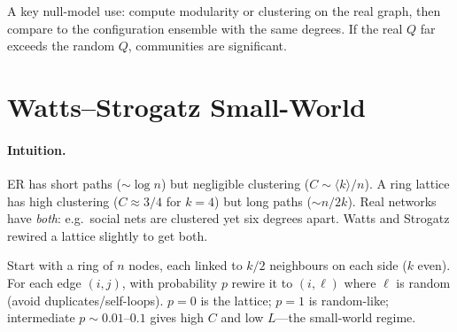 A key null-model use: compute modularity or clustering on the real graph, then compare to the configuration ensemble with the same degrees. If the real $Q$ far exceeds the random $Q$, communities are significant.

\section{Watts--Strogatz Small-World}
\label{sec:ws}
\paragraph{Intuition.} ER has short paths ($\sim\log n$) but negligible clustering ($C\sim\langle k\rangle/n$). A ring lattice has high clustering ($C\approx3/4$ for $k=4$) but long paths ($\sim n/2k$). Real networks have \emph{both}: e.g.\ social nets are clustered yet six degrees apart. Watts and Strogatz rewired a lattice slightly to get both.

\begin{definition}\label{def:ws}
Start with a ring of $n$ nodes, each linked to $k/2$ neighbours on each side ($k$ even). For each edge $(i,j)$, with probability $p$ rewire it to $(i,\ell)$ where $\ell$ is random (avoid duplicates/self-loops). $p=0$ is the lattice; $p=1$ is random-like; intermediate $p\sim0.01$--$0.1$ gives high $C$ and low $L$---the small-world regime.
\end{definition}

